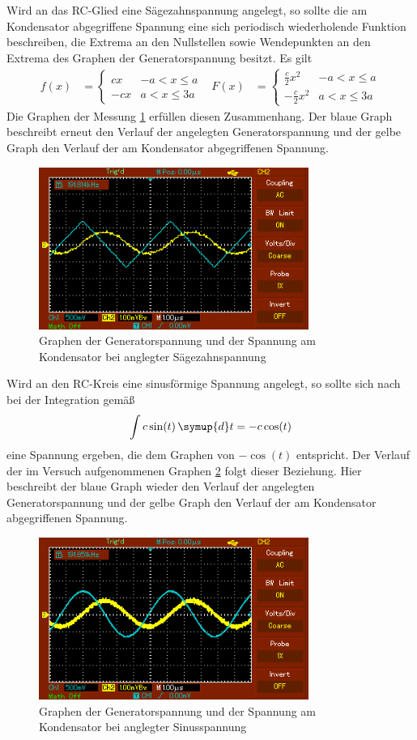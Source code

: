 Wird an das RC-Glied eine Sägezahnspannung angelegt, so sollte die am Kondensator
abgegriffene Spannung eine sich periodisch wiederholende Funktion beschreiben, die
Extrema an den Nullstellen sowie Wendepunkten an den Extrema des Graphen der
Generatorspannung besitzt. Es gilt
\begin{align}
  f(x)&=
  \begin{cases}
    c x & -a<x\leq a\\
    -c x & a<x\leq 3a
  \end{cases}
  & F(x)&=
  \begin{cases}
    \frac{c}{2} x^2 & -a<x\leq a\\
    -\frac{c}{2} x^2 & a<x\leq 3a
  \end{cases}
\end{align}
Die Graphen der Messung \ref{fig:saegezahn} erfüllen diesen Zusammenhang.
Der blaue Graph beschreibt erneut den Verlauf der angelegten Generatorspannung und
der gelbe Graph den Verlauf der am Kondensator abgegriffenen Spannung.
\begin{figure}
  \centering
  \includegraphics[width=250pt]{data/integration_saegezahn.PNG}
  \caption{Graphen der Generatorspannung und der Spannung am Kondensator bei anglegter
  Sägezahnspannung}
  \label{fig:saegezahn}
\end{figure}


Wird an den RC-Kreis eine sinusförmige Spannung angelegt, so sollte sich nach bei der
Integration gemäß
\begin{equation}
  \int c\sin(t) \, \symup{d}t=-c\cos(t)
\end{equation}
eine Spannung ergeben, die dem Graphen von $-\cos(t)$ entspricht. Der Verlauf der
im Versuch aufgenommenen Graphen \ref{fig:sinus} folgt dieser Beziehung. Hier beschreibt der blaue Graph
wieder den Verlauf der angelegten Generatorspannung und der gelbe Graph den Verlauf der
am Kondensator abgegriffenen Spannung.
\begin{figure}
  \centering
  \includegraphics[width=250pt]{data/integration_sinus.PNG}
  \caption{Graphen der Generatorspannung und der Spannung am Kondensator bei anglegter
  Sinusspannung}
  \label{fig:sinus}
\end{figure}
